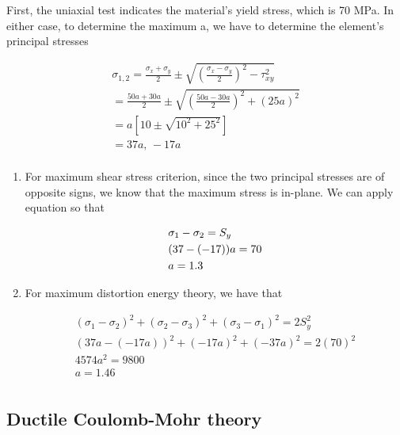 \documentclass[
10pt,
a4paper,
openany,
svgnames,
]{book}
\begin{document}
\begin{solution}

  First, the uniaxial test indicates the material’s yield stress, which is 70 MPa. In either case, to determine the maximum a, we have to determine the element’s principal stresses

  \[\begin{gathered}
      \sigma_{1,2} = \frac{\sigma_x + \sigma_y}{2} \pm \sqrt {\left( \frac{\sigma_x - \sigma_y}{2} \right)^2 - \tau _{xy}^2}  \\ 
      = \frac{50a + 30a}{2} \pm \sqrt {\left( \frac{50a - 30a}{2} \right)^2 + (25a)^2}  \\ 
      = a\left[ 10 \pm \sqrt {10^2 + 25^2} \right] \\ 
      = 37a \text{, } - 17a \\ 
    \end{gathered} \]
  
  \begin{enumerate}
  \item For maximum shear stress criterion, since the two principal stresses are of opposite signs, we know that the maximum stress is in-plane. We can apply equation so that
    
    \[\begin{gathered}
        \sigma_1 - \sigma_2 = S_y \hfill \\
        (37 - ( - 17))a = 70 \hfill \\
        a = 1.3 \hfill \\ 
      \end{gathered} \]
    
  \item For maximum distortion energy theory, we have that
    
    \[\begin{gathered}
        (\sigma_1 - \sigma_2)^2 + (\sigma_2 - \sigma_3)^2 + (\sigma_3 - \sigma_1)^2 = 2S_y^2 \\ 
        (37a - ( - 17a))^2 + ( - 17a)^2 + ( - 37a)^2 = 2(70)^2 \\ 
        4574a^2 = 9800 \\ 
        a = 1.46 \\ 
      \end{gathered} \]
    \end{enumerate}
\end{solution}

\subsection{Ductile Coulomb-Mohr theory}
\end{document}

